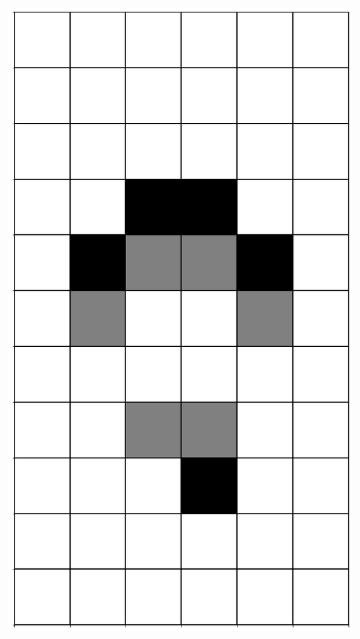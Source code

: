 \documentclass[12pt]{article}
\numberwithin{figure}{section} %
\begin{document}
\begin{figure}[H]
\begin{subfigure}{0.19\textwidth}
     \includegraphics[width=\linewidth]{Section4/2.2}
   \end{subfigure}
        \begin{subfigure}{0.19\textwidth}
     \centering

\end{subfigure}
\end{figure}
\end{document}
